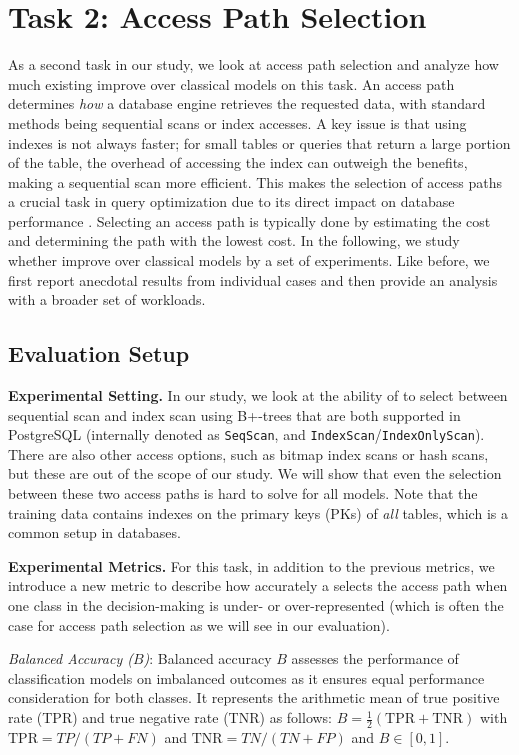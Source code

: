 \section{Task 2: Access Path Selection} \label{sec:access_path_selection}
As a second task in our study, we look at access path selection and analyze how much existing \lcms improve over classical models on this task.
An access path determines \textit{how} a database engine retrieves the requested data, with standard methods being sequential scans or index accesses. 
A key issue is that using indexes is not always faster; for small tables or queries that return a large portion of the table, the overhead of accessing the index can outweigh the benefits, making a sequential scan more efficient. 
This makes the selection of access paths a crucial task in query optimization due to its direct impact on database performance \cite{selinger1979}. 
Selecting an access path is typically done by estimating the cost and determining the path with the lowest cost.
In the following, we study whether \lcms improve over classical models by a set of experiments. 
Like before, we first report anecdotal results from individual cases and then provide an analysis with a broader set of workloads.

\subsection{Evaluation Setup}
\noindent\textbf{Experimental Setting.}
In our study, we look at the ability of \lcms to select between sequential scan and index scan using B+-trees that are both supported in PostgreSQL (internally denoted as \texttt{SeqScan}, and \texttt{IndexScan}/\texttt{IndexOnlyScan}). 
There are also other access options, such as bitmap index scans or hash scans, but these are out of the scope of our study.
We will show that even the selection between these two access paths is hard to solve for all models.
Note that the training data contains indexes on the primary keys (PKs) of \textit{all} tables, which is a common setup in databases.


\noindent\textbf{Experimental Metrics.}
For this task, in addition to the previous metrics, we introduce a new metric to describe how accurately a \lcm selects the access path when one class in the decision-making is under- or over-represented (which is often the case for access path selection as we will see in our evaluation).
\begin{definition}
\textit{Balanced Accuracy ($B$)}: Balanced accuracy $B$ assesses the performance of classification models on imbalanced outcomes as it ensures equal performance consideration for both classes.
It represents the arithmetic mean of true positive rate (TPR) and true negative rate (TNR) as follows:
$B = \frac{1}{2} \left( \text{TPR} + \text{TNR} \right)$ with $\text{TPR} = {TP}/(TP + FN)$ and $\text{TNR} = {TN}/(TN + FP)$ and $B \in [0, 1]$.
\end{definition}


